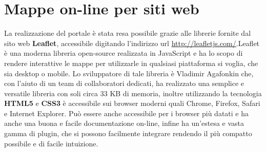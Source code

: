 \documentclass[a4paper,11pt]{article}
\begin{document}
\newpage

\section{Mappe on-line per siti web}
\label{sec:3}
La realizzazione del portale è stata resa possibile grazie alle librerie fornite dal sito web \textbf{Leaflet}, accessibile digitando l'indirizzo url \url{http://leafletjs.com/}.\newline Leaflet è una moderna libreria open-source realizzata in JavaScript e ha lo scopo di rendere interattive le mappe per utilizzarle in qualsiasi piattaforma si voglia, che sia desktop o mobile. Lo sviluppatore di tale libreria è Vladimir Agafonkin che, con l'aiuto di un team di collaboratori dedicati, ha realizzato una semplice e versatile libreria con soli circa 33 KB di memoria, inoltre utilizzando la tecnologia \textbf{HTML5} e \textbf{CSS3} è accessibile sui browser moderni quali Chrome, Firefox, Safari e Internet Explorer. Può essere anche accessibile per i browser più datati e ha anche una buona e facile documentazione on-line, infine ha un'estesa e vasta gamma di plugin, che si possono facilmente integrare rendendo il più compatto possibile e di facile intuizione.
\end{document}
